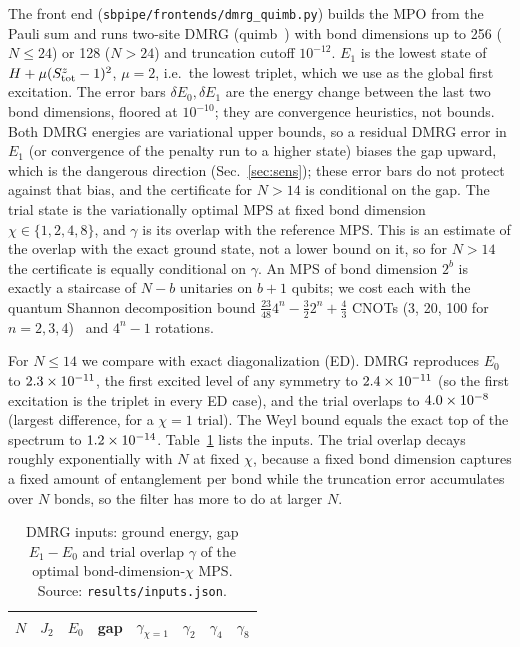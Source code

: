 \documentclass[aps,pra,twocolumn,superscriptaddress,nofootinbib]{revtex4-2}
\begin{document}
The front end (\texttt{sbpipe/frontends/dmrg\_quimb.py}) builds the MPO from the Pauli sum and runs
two-site DMRG (quimb~\cite{Gray2018}) with bond dimensions up to 256 ($N\le24$) or 128 ($N>24$) and
truncation cutoff $10^{-12}$. $E_1$ is the lowest state of $H+\mu(S^z_{\rm tot}-1)^2$, $\mu=2$, i.e.\
the lowest triplet, which we use as the global first excitation. The error bars $\delta E_0,\delta E_1$
are the energy change between the last two bond dimensions, floored at $10^{-10}$; they are
convergence heuristics, not bounds. Both DMRG energies are variational upper bounds, so a residual
DMRG error in $E_1$ (or convergence of the penalty run to a higher state) biases the gap upward, which
is the dangerous direction (Sec.~\ref{sec:sens}); these error bars do not protect against that bias, and
the certificate for $N>14$ is conditional on the gap. The trial state is
the variationally optimal MPS at fixed bond dimension $\chi\in\{1,2,4,8\}$, and $\gamma$ is its
overlap with the reference MPS. This is an estimate of the overlap with the exact ground state, not a
lower bound on it, so for $N>14$ the certificate is equally conditional on $\gamma$. An MPS of bond dimension $2^b$ is exactly a staircase of $N-b$ unitaries
on $b+1$ qubits; we cost each with the quantum Shannon decomposition bound
$\frac{23}{48}4^n-\frac32 2^n+\frac43$ CNOTs (3, 20, 100 for $n=2,3,4$)~\cite{Shende2006} and $4^n-1$
rotations.

For $N\le14$ we compare with exact diagonalization (ED). DMRG reproduces $E_0$ to $2.3\times10^{-11}$,
the first excited level of any symmetry to $2.4\times10^{-11}$ (so the first excitation is the triplet in
every ED case), and the trial overlaps to
$4.0\times10^{-8}$ (largest difference, for a $\chi=1$ trial). The Weyl bound equals the exact top of the spectrum to $1.2\times10^{-14}$.
Table~\ref{tab:inputs} lists the inputs. The trial overlap decays roughly exponentially with $N$ at
fixed $\chi$, because a fixed bond dimension captures a fixed amount of entanglement per bond while
the truncation error accumulates over $N$ bonds, so the filter has more to do at larger $N$.

\begin{table}[t]
\caption{DMRG inputs: ground energy, gap $E_1-E_0$ and trial overlap $\gamma$ of the optimal
bond-dimension-$\chi$ MPS. Source: \texttt{results/inputs.json}.}
\label{tab:inputs}
\begin{ruledtabular}
\begin{tabular}{rrrrrrrr}
$N$ & $J_2$ & $E_0$ & gap & $\gamma_{\chi=1}$ & $\gamma_{2}$ & $\gamma_4$ & $\gamma_8$\\
\midrule

\end{tabular}
\end{ruledtabular}
\end{table}
\end{document}
